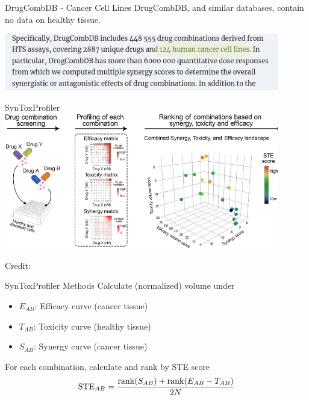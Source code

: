 \documentclass{beamer}
\begin{document}
\begin{frame}{DrugCombDB - Cancer Cell Lines}
    DrugCombDB, and similar databases, contain no data on healthy tissue.
    \begin{center}
        \includegraphics[width = 0.9\textwidth]{figs/drug-comb-cancer-cells.png}
    \end{center}
\end{frame}

\begin{frame}{SynToxProfiler}
    \centering
    \includegraphics[width=0.9\textwidth]{figs/syntoxprofiler.jpg}

    \hspace*{15pt}\hbox{\scriptsize Credit:}
\end{frame}


\begin{frame}{SynToxProfiler Methods}
    Calculate (normalized) volume under 
    \begin{itemize}
        \item $E_{AB}$: Efficacy curve (cancer tissue)
        \item $T_{AB}$: Toxicity curve (healthy tissue)
        \item $S_{AB}$: Synergy curve (cancer tissue)
    \end{itemize}
    \vfill
    For each combination, calculate and rank by STE score 
    \[
        {\rm STE}_{AB} = \frac{{\rm rank}(S_{AB}) + {\rm rank}(E_{AB} - T_{AB})}{2N}
    \]

\end{frame}
\end{document}
